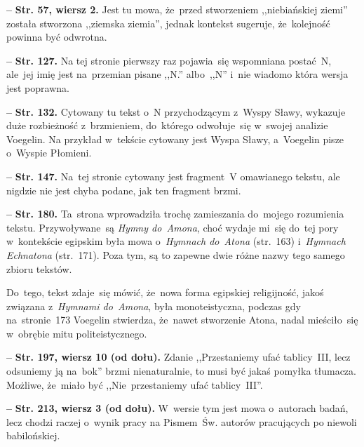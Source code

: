 \documentclass[a4paper,11pt]{article}
\newcommand{\spaceThree}{0.25em}
\newcommand{\tb}{\textbf}
\newcommand{\noi}{\noindent}
\newcommand{\start}{\noi \tb{--} {}}
\newcommand{\Str}[1]{\tb{Str. #1.}}
\newcommand{\StrWg}[2]{\tb{Str. #1, wiersz #2.}}
\newcommand{\StrWd}[2]{\tb{Str. #1, wiersz #2 (od dołu).}}
\begin{document}
\vspace{\spaceThree}


\start \StrWg{57}{2} Jest tu mowa, że~przed stworzeniem ,,niebiańskiej
ziemi'' została stworzona ,,ziemska ziemia'', jednak kontekst
sugeruje, że~kolejność powinna być odwrotna.

\vspace{\spaceThree}


\start \Str{127} Na tej stronie pierwszy raz pojawia~się wspomniana
postać~N, ale~jej imię jest na~przemian pisane ,,N.'' albo~,,N'' i~nie
wiadomo która wersja jest poprawna.

\vspace{\spaceThree}


\start \Str{132} Cytowany tu tekst o~N przychodzącym z~Wyspy Sławy,
wykazuje duże rozbieżność z~brzmieniem, do~którego odwołuje~się
w~swojej analizie Voegelin. Na przykład w~tekście cytowany jest Wyspa
Sławy, a~Voegelin pisze o~Wyspie Płomieni.

\vspace{\spaceThree}


\start \Str{147} Na~tej stronie cytowany jest fragment~V omawianego
tekstu, ale nigdzie nie jest chyba podane, jak ten fragment brzmi.

\vspace{\spaceThree}


\start \Str{180} Ta~strona wprowadziła trochę zamieszania do~mojego
rozumienia tekstu. Przywoływane~są \emph{Hymny do~Amona}, choć wydaje
mi~się do~tej pory w~kontekście egipskim była mowa o~\emph{Hymnach
  do~Atona} (str.~163) i~\emph{Hymnach Echnatona} (str.~171). Poza
tym, są to zapewne dwie różne nazwy tego samego zbioru tekstów.

Do~tego, tekst zdaje~się mówić, że~nowa forma egipskiej religijność,
jakoś związana z~\emph{Hymnami do~Amona}, była monoteistyczna, podczas
gdy na~stronie~173 Voegelin stwierdza, że~nawet stworzenie Atona,
nadal mieściło~się w~obrębie mitu politeistycznego.

\vspace{\spaceThree}


\start \StrWd{197}{10} Zdanie ,,Przestaniemy ufać tablicy~III, lecz
odsuniemy ją na~bok'' brzmi nienaturalnie, to musi być jakaś pomyłka
tłumacza. Możliwe, że~miało być ,,Nie~przestaniemy ufać tablicy~III''.

\vspace{\spaceThree}


\start \StrWd{213}{3} W~wersie tym jest mowa o~autorach badań, lecz
chodzi raczej o~wynik pracy na Pismem~Św. autorów pracujących po
niewoli babilońskiej.
\end{document}
